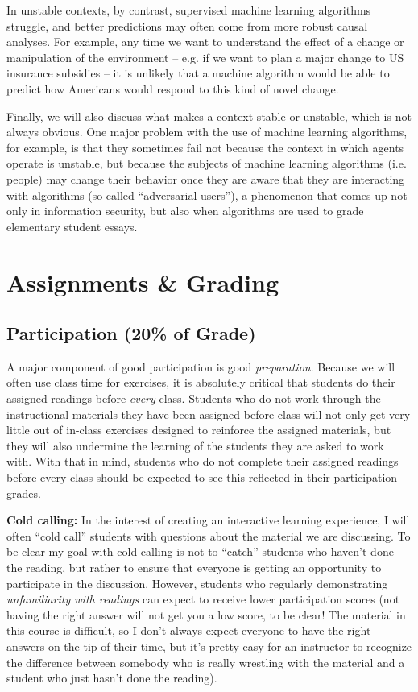 \documentclass[12pt]{article}
\begin{document}
In unstable contexts, by contrast, supervised machine learning algorithms struggle, and better predictions may often come from more robust causal analyses. For example, any time we want to understand the effect of a change or manipulation of the environment -- e.g. if we want to plan a major change to US insurance subsidies -- it is unlikely that a machine algorithm would be able to predict how Americans would respond to this kind of novel change.

Finally, we will also discuss what makes a context stable or unstable, which is not always obvious. One major problem with the use of machine learning algorithms, for example, is that they sometimes fail not because the context in which agents operate is unstable, but because the subjects of machine learning algorithms (i.e. people) may change their behavior once they are aware that they are interacting with algorithms (so called ``adversarial users''), a phenomenon that comes up not only in information security, but also when algorithms are used to grade elementary student essays.

\section{Assignments \& Grading}

\subsection{Participation (20\% of Grade)}

A major component of good participation is good \emph{preparation}. Because we will often use class time for exercises, it is absolutely critical that students do their assigned readings before \emph{every} class. Students who do not work through the instructional materials they have been assigned before class will not only get very little out of in-class exercises designed to reinforce the assigned materials, but they will also undermine the learning of the students they are asked to work with. With that in mind, students who do not complete their assigned readings before every class should be expected to see this reflected in their participation grades.

\textbf{Cold calling:} In the interest of creating an interactive learning experience, I will often ``cold call'' students with questions about the material we are discussing. To be clear my goal with cold calling is not to ``catch'' students who haven't done the reading, but rather to ensure that everyone is getting an opportunity to participate in the discussion. However, students who regularly demonstrating \emph{unfamiliarity with readings} can expect to receive lower participation scores (not having the right answer will not get you a low score, to be clear! The material in this course is difficult, so I don't always expect everyone to have the right answers on the tip of their time, but it's pretty easy for an instructor to recognize the difference between somebody who is really wrestling with the material and a student who just hasn't done the reading). 
\end{document}
